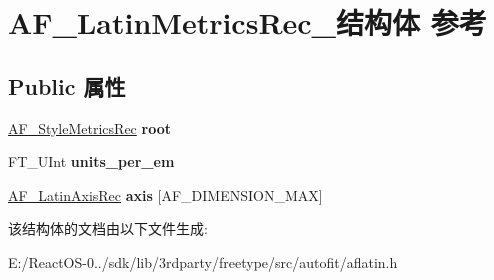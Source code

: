 \hypertarget{struct_a_f___latin_metrics_rec__}{}\section{A\+F\+\_\+\+Latin\+Metrics\+Rec\+\_\+结构体 参考}
\label{struct_a_f___latin_metrics_rec__}
\subsection*{Public 属性}
\begin{DoxyCompactItemize}
\item 
\mbox{\label{struct_a_f___latin_metrics_rec___a139afc73e5f0e6c90d6865a848e16f42}} 
\hyperlink{struct_a_f___style_metrics_rec__}{A\+F\+\_\+\+Style\+Metrics\+Rec} {\bfseries root}
\item 
\mbox{\label{struct_a_f___latin_metrics_rec___adde47f3bb5791425e08f5c3b8680d731}} 
F\+T\+\_\+\+U\+Int {\bfseries units\+\_\+per\+\_\+em}
\item 
\mbox{\label{struct_a_f___latin_metrics_rec___af1bc992e9c29a875d1f3ad1fe1b48ba3}} 
\hyperlink{struct_a_f___latin_axis_rec__}{A\+F\+\_\+\+Latin\+Axis\+Rec} {\bfseries axis} \mbox{[}A\+F\+\_\+\+D\+I\+M\+E\+N\+S\+I\+O\+N\+\_\+\+M\+AX\mbox{]}
\end{DoxyCompactItemize}


该结构体的文档由以下文件生成\+:\begin{DoxyCompactItemize}
\item 
E\+:/\+React\+O\+S-\/0../sdk/lib/3rdparty/freetype/src/autofit/aflatin.\+h\end{DoxyCompactItemize}
